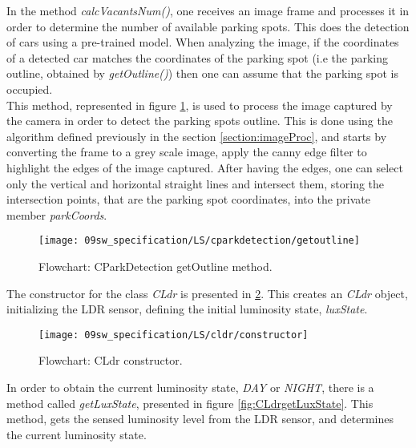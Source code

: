 \clearpage
{}

In the method \textit{calcVacantsNum()}, one receives an image frame and processes it in order to determine the number of available parking spots. This does the detection of cars using a pre-trained model. When analyzing the image, if the coordinates of a detected car matches the coordinates of the parking spot (i.e the parking outline, obtained by \textit{getOutline()}) then one can assume that the parking spot is occupied. \\

This method, represented in figure \ref{fig:CParkDetectiongetoutline}, is used to process the image captured by the camera in order to detect the parking spots outline. This is done using the algorithm defined previously in the section \ref{section:imageProc}, and starts by converting the frame to a grey scale image, apply the canny edge filter to highlight the edges of the image captured. After having the edges, one can select only the vertical and horizontal straight lines and intersect them, storing the intersection points, that are the parking spot coordinates, into the private member \textit{parkCoords}.

\begin{figure}[H]
	\centering			
	\texttt{[image: 09sw\_specification/LS/cparkdetection/getoutline]}
	\caption{Flowchart: CParkDetection getOutline method.}
	\label{fig:CParkDetectiongetoutline}
\end{figure}

\clearpage
{}

The constructor for the class \textit{CLdr} is presented in \ref{fig:CLdrconstructor}. This creates an \textit{CLdr} object, initializing the LDR sensor, defining the initial luminosity state, \textit{luxState}.

\begin{figure}[H]
	\centering
	\texttt{[image: 09sw\_specification/LS/cldr/constructor]}
	\caption{Flowchart: CLdr constructor.}
	\label{fig:CLdrconstructor}
\end{figure}

\clearpage
In order to obtain the current luminosity state, \textit{DAY} or \textit{NIGHT}, there is a method called \textit{getLuxState}, presented in figure \ref{fig:CLdrgetLuxState}. This method, gets the sensed luminosity level from the LDR sensor, and determines the current luminosity state.

